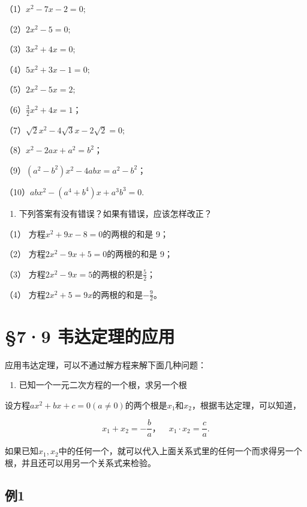 （1）\(x^{2} - 7x - 2 = 0;\)

（2）\(2x^{2} - 5 = 0;\)

（3）\(3x^{2} + 4x = 0;\)

（4）\(5x^{2} + 3x - 1 = 0;\)

（5）\(2x^{2} - 5x = 2;\)

（6）\(\frac{3}{2} x^2 + 4x = 1\)；

（7）\(\sqrt{2} x^{2} - 4\sqrt{3} x - 2\sqrt{2} = 0;\)

（8）\(x^{2} - 2ax + a^{2} = b^{2}\)；

（9）\((a^2 - b^2)x^2 - 4abx = a^2 - b^2\)；

（10）\(abx^{2} - (a^{4} + b^{4})x + a^{3}b^{3} = 0.\)

\begin{enumerate}[start=2]
\item
  下列答案有没有错误？如果有错误，应该怎样改正？
\end{enumerate}

（1） 方程\(x^{2}+9x-8=0\)的两根的和是 9；

（2） 方程\(2x^{2}-9x+5=0\)的两根的和是 9；

（3） 方程\(2x^{2}-9x=5\)的两根的积是\(\frac{5}{2}\)；

（4） 方程\(2x^{2}+5=9x\)的两根的和是\(-\frac{9}{2}\)。

\section{§7·9 韦达定理的应用}

应用韦达定理，可以不通过解方程来解下面几种问题：

\begin{enumerate}
\item
  已知一个一元二次方程的一个根，求另一个根
\end{enumerate}

设方程\(ax^2 + bx + c = 0 (a \neq 0)\)的两个根是\(x_1\)和\(x_2\)，根据韦达定理，可以知道，

\[
x _ {1} + x _ {2} = - \frac{b}{a}\text{，} \quad x _ {1} \cdot x _ {2} = \frac{c}{a}.
\]

如果已知\(x_{1}, x_{2}\)中的任何一个，就可以代入上面关系式里的任何一个而求得另一个根，并且还可以用另一个关系式来检验。

\subsection{例1}

